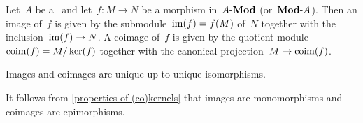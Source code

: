 \begin{example*}
  Let~$A$ be a~{\kalg} and let~$f \colon M \to N$ be a morphism in~$\text{$A$-$\mathbf{Mod}$}$ (or~$\text{$\mathbf{Mod}$-$A$}$).
  Then an image of~$f$ is given by the submodule~$\operatorname{im}(f) = f(M)$ of~$N$ together with the inclusion~$\operatorname{im}(f) \to N$.
  A coimage of~$f$ is given by the quotient module~$\operatorname{coim}(f) = M/\ker(f)$ together with the canonical projection~$M \to \operatorname{coim}(f)$.
\end{example*}


\begin{remarknonum}
  Images and coimages are unique up to unique isomorphisms.
\end{remarknonum}


\begin{remark*}
  It follows from \cref{properties of (co)kernels} that images are monomorphisms and coimages are epimorphisms.
\end{remark*}


